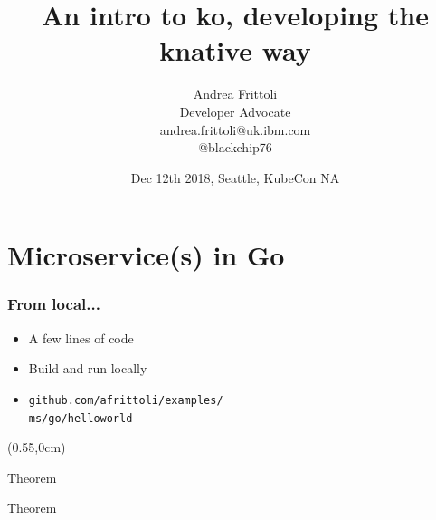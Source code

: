 \documentclass[aspectratio=169,11pt,hyperref={colorlinks=true}]{beamer}
\title{An intro to ko, developing the knative way}
\date[KubeCon NA]{Dec 12th 2018, Seattle, KubeCon NA}
\author[Andrea]{
  Andrea Frittoli \\
  Developer Advocate \\
  andrea.frittoli@uk.ibm.com \\
  @blackchip76
}
\begin{document}
\begin{frame}[noframenumbering]
\titlepage{}
\end{frame}

\section{Microservice(s) in Go}

\begin{lgrayrwhiteframe}
  \frametitle{From local...}
  \large
  \begin{itemize}
    \item A few lines of code
    \item Build and run locally
    \item \small\texttt{github.com/afrittoli/examples/} \\
    \texttt{ms/go/helloworld}
  \end{itemize}
  \begin{textblock*}{0.4\paperwidth}(0.55\paperwidth,0cm)
    \begin{beamercolorbox}[leftskip=1cm,rightskip=1cm,rounded=true,sep=2.5ex]{Theorem}
        
    \end{beamercolorbox}
    \begin{beamercolorbox}[leftskip=1cm,rightskip=1cm,rounded=true]{Theorem}
        
    \end{beamercolorbox}
  \end{textblock*}
\end{lgrayrwhiteframe}
\end{document}
